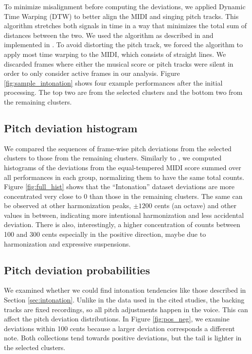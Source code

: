 \begin{appendices}
To minimize misalignment before computing the deviations, we applied Dynamic Time Warping (DTW) \cite{berndt1994using} to better align the MIDI and singing pitch tracks. This algorithm stretches both signals in time in a way that minimizes the total sum of distances between the two. We used the algorithm as described in \cite{muller2015fundamentals} and implemented in \cite{mcfee2015librosa}. To avoid distorting the pitch track, we forced the algorithm to apply most time warping to the MIDI, which consists of straight lines. We discarded frames where either the musical score or pitch tracks were silent in order to only consider active frames in our analysis. Figure \ref{fig:sample_intonation} shows four example performances after the initial processing. The top two are from the selected clusters and the bottom two from the remaining clusters.

\subsection{Pitch deviation histogram}
We compared the sequences of frame-wise pitch deviations from the selected clusters to those from the remaining clusters. Similarly to \cite{nichols2012automatically}, we computed histograms of the deviations from the equal-tempered MIDI score summed over all performances in each group, normalizing them to have the same total counts. Figure \ref{fig:full_hist} shows that the ``Intonation'' dataset deviations are more concentrated very close to 0 than those in the remaining clusters. The same can be observed at other harmonization peaks, $\pm1200$ cents (an octave) and other values in between, indicating more intentional harmonization and less accidental deviation. There is also, interestingly, a higher concentration of counts between 100 and 300 cents especially in the positive direction, maybe due to harmonization and expressive suspensions.

\subsection{Pitch deviation probabilities}
We examined whether we could find intonation tendencies like those described in Section \ref{sec:intonation}. Unlike in the data used in the cited studies, the backing tracks are fixed recordings, so all pitch adjustments happen in the voice. This can affect the pitch deviation distributions. In Figure \ref{fig:pos_neg}, we examine deviations within 100 cents because a larger deviation corresponds a different note. Both collections tend towards positive deviations, but the tail is lighter in the selected clusters.


\end{appendices}
